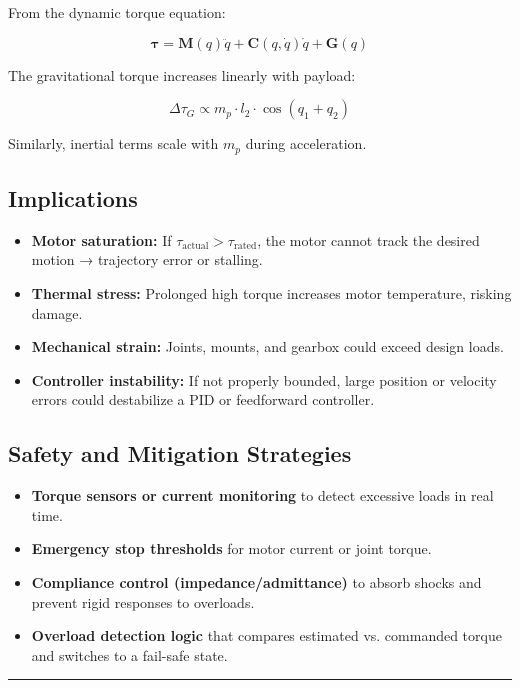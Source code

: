 \documentclass[a4paper,12pt]{article}
\begin{document}
From the dynamic torque equation:

\[
\boldsymbol{\tau} = \mathbf{M}(q)\ddot{q} + \mathbf{C}(q, \dot{q})\dot{q} + \mathbf{G}(q)
\]

The gravitational torque increases linearly with payload:

\[
\Delta \tau_{G} \propto m_p \cdot l_2 \cdot \cos(q_1 + q_2)
\]

Similarly, inertial terms scale with $m_p$ during acceleration.

\subsection*{Implications}

\begin{itemize}
    \item \textbf{Motor saturation:} If $\tau_{\text{actual}} > \tau_{\text{rated}}$, the motor cannot track the desired motion → trajectory error or stalling.
    \item \textbf{Thermal stress:} Prolonged high torque increases motor temperature, risking damage.
    \item \textbf{Mechanical strain:} Joints, mounts, and gearbox could exceed design loads.
    \item \textbf{Controller instability:} If not properly bounded, large position or velocity errors could destabilize a PID or feedforward controller.
\end{itemize}

\subsection*{Safety and Mitigation Strategies}

\begin{itemize}
    \item \textbf{Torque sensors or current monitoring} to detect excessive loads in real time.
    \item \textbf{Emergency stop thresholds} for motor current or joint torque.
    \item \textbf{Compliance control (impedance/admittance)} to absorb shocks and prevent rigid responses to overloads.
    \item \textbf{Overload detection logic} that compares estimated vs. commanded torque and switches to a fail-safe state.
\end{itemize}

\vspace{1em}
\noindent\rule{\linewidth}{0.6pt}
\vspace{1em}
\end{document}
